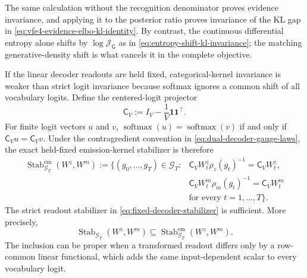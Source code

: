 The same calculation without the recognition denominator proves evidence invariance, and applying it to the posterior ratio proves invariance of the KL gap in \cref{eq:vfe4-evidence-elbo-kl-identity}. By contrast, the continuous differential entropy alone shifts by $\log\mathcal J_{\mathsf G}$ as in \cref{eq:entropy-shift-kl-invariance}; the matching generative-density shift is what cancels it in the complete objective.

If the linear decoder readouts are held fixed, categorical-kernel invariance is weaker than strict logit invariance because softmax ignores a common shift of all vocabulary logits. Define the centered-logit projector
\begin{equation}
\mathsf C_V
:=I_V-\frac1V\boldsymbol 1\boldsymbol 1^\top.
\label{eq:centered-logit-projector}
\end{equation}
For finite logit vectors $u$ and $v$, $\operatorname{softmax}(u)=\operatorname{softmax}(v)$ if and only if $\mathsf C_Vu=\mathsf C_Vv$. Under the contragredient convention in \cref{eq:dual-decoder-gauge-laws}, the exact held-fixed emission-kernel stabilizer is therefore
\begin{equation}
\begin{aligned}
\operatorname{Stab}^{\mathrm{em}}_{\mathcal G_T}(W^z,W^m)
:=\bigl\{(g_0,\ldots,g_T)\in\mathcal G_T:
&\mathsf C_VW_t^z\rho_z(g_t)^{-1}
=\mathsf C_VW_t^z,\\
&\mathsf C_VW_t^m\rho_m(g_t)^{-1}
=\mathsf C_VW_t^m\\
&\text{for every }t=1,\ldots,T\bigr\}.
\end{aligned}
\label{eq:fixed-decoder-emission-kernel-stabilizer}
\end{equation}
The strict readout stabilizer in \cref{eq:fixed-decoder-stabilizer} is sufficient. More precisely,
\begin{equation}
\operatorname{Stab}_{\mathcal G_T}(W^z,W^m)
\subseteq
\operatorname{Stab}^{\mathrm{em}}_{\mathcal G_T}(W^z,W^m).
\label{eq:strict-readout-stabilizer-subset}
\end{equation}
The inclusion can be proper when a transformed readout differs only by a row-common linear functional, which adds the same input-dependent scalar to every vocabulary logit.

